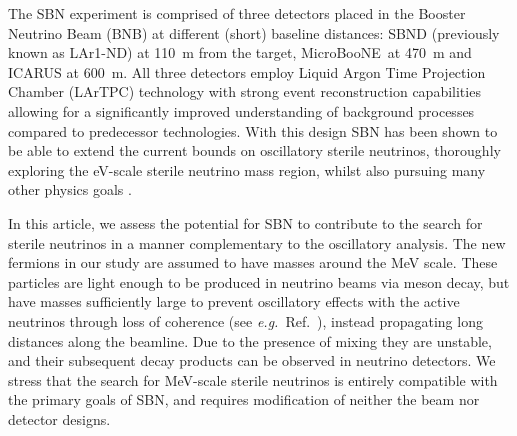 \documentclass[11pt, a4paper]{article}
\newcommand{\refref}[1]{Ref.~\cite{#1}}
\def\eg{\emph{e.g.}}
\def\muboone{MicroBooNE}
\begin{document}
The SBN experiment is comprised of three detectors placed in the Booster
Neutrino Beam (BNB) at different (short) baseline distances: SBND (previously
known as LAr1-ND) at 110~m from the target, \muboone\ at 470~m and ICARUS at
600~m.  All three detectors employ Liquid Argon Time Projection Chamber
(LArTPC) technology \cite{Rubbia:1977} with strong event reconstruction
capabilities allowing for a significantly improved understanding of background
processes compared to predecessor technologies. 
%
With this design SBN has been shown to be able to extend the current bounds on
oscillatory sterile neutrinos, thoroughly exploring the eV-scale sterile
neutrino mass region, whilst also pursuing many other physics goals
\cite{Antonello:2015lea}.

In this article, we assess the potential for SBN to contribute to the search
for sterile neutrinos in a manner complementary to the oscillatory analysis.
The new fermions in our study are assumed to have masses around the MeV scale.
These particles are light enough to be produced in neutrino beams via meson
decay, but have masses sufficiently large to prevent oscillatory effects with
the active neutrinos through loss of coherence (see \eg\
\refref{Akhmedov:2009rb}), instead propagating long distances along the
beamline. Due to the presence of mixing they are unstable, and their
subsequent decay products can be observed in neutrino detectors.
%
%
%
We stress that the search for MeV-scale sterile neutrinos is entirely
compatible with the primary goals of SBN, and requires modification of
neither the beam nor detector designs. 

\end{document}
